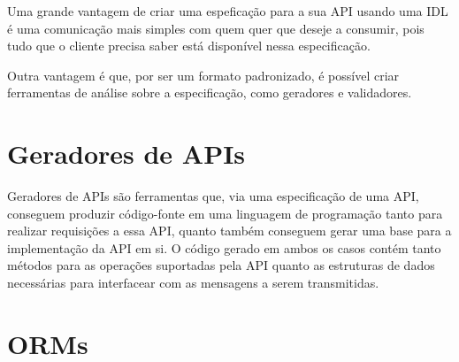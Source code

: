 Uma grande vantagem de criar uma espeficação para a sua API usando uma IDL é uma
comunicação mais simples com quem quer que deseje a consumir, pois tudo que o cliente
precisa saber está disponível nessa especificação.

Outra vantagem é que, por ser um formato padronizado, é possível criar ferramentas
de análise sobre a especificação, como geradores e validadores.

\section{Geradores de APIs}

Geradores de APIs são ferramentas que, via uma especificação de uma API,
conseguem produzir código-fonte em uma linguagem de programação tanto para
realizar requisições a essa API, quanto também conseguem gerar uma base para
a implementação da API em si. O código gerado em ambos os casos contém tanto
métodos para as operações suportadas pela API quanto as estruturas de dados
necessárias para interfacear com as mensagens a serem transmitidas.

\section{ORMs}

